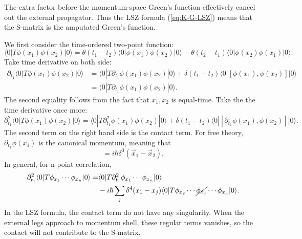 The extra factor before the momentum-space Green's function effectively cancel out the external propagator. 
Thus the LSZ formula (\ref{eq:K-G-LSZ}) means that the S-matrix is the amputated Green's function.


\begin{framedrmk}
We first consider the time-ordered two-point function:
\begin{equation*}
	\langle 0|T\phi(x_1)\phi(x_2)|0\rangle
	= \theta(t_1-t_2)\langle 0|\phi(x_1)\phi(x_2)|0\rangle -
	\theta(t_2-t_1)\langle 0|\phi(x_2)\phi(x_1)|0\rangle.
\end{equation*}	
Take time derivative on both side:
\begin{equation*}
\begin{aligned}
	\partial_{t_1} \langle 0|T\phi(x_1)\phi(x_2)|0\rangle
	&= \langle 0|T\partial_{t_1}\phi(x_1)\phi(x_2)|0\rangle +
	\delta(t_1-t_2)\langle 0|[\phi(x_1),\phi(x_2)]|0\rangle \\
	&= \langle 0|T\partial_{t_1}\phi(x_1)\phi(x_2)|0\rangle.
\end{aligned}
\end{equation*}
The second equality follows from the fact that $x_1,x_2$ is equal-time.
Take the the time derivative once more:
\begin{equation*}
	\partial^2_{t_1} \langle 0|T\phi(x_1)\phi(x_2)|0\rangle
	= \langle 0|T\partial^2_{t_1}\phi(x_1)\phi(x_2)|0\rangle +
	\delta(t_1-t_2)\langle 0|[\partial_{t_1}\phi(x_1),\phi(x_2)]|0\rangle.
\end{equation*}
The second term on the right hand side is the contact term.
For free theory, $\partial_{t_1}\phi(x_1)$ is the canonical momentum, meaning that
\begin{equation*}
	[\phi(\vec x_1, t),\partial_{t}\phi(\vec x_1,t)] = i \hbar \delta^{3}(\vec x_1-\vec x_2).
\end{equation*}
In general, for n-point correlation,
\begin{equation*}
\begin{aligned}
	 \partial_{t_1}^2 \langle 0|T\phi_{x_1}\cdots\phi_{x_n}|0\rangle 
	=& \langle 0|T\partial_{t_1}^2\phi_{x_1}\cdots\phi_{x_n}|0\rangle \\
	 &-i\hbar \sum_j \delta^4(x_1-x_j)\langle 0|T\phi_{x_2}\cdots\cancel{\phi_{x_j}}\cdots\phi_{x_n}|0\rangle.
\end{aligned}
\end{equation*}
In the LSZ formula, the contact term do not have any singularity.
When the external legs approach to momentum shell, these regular terms vanishes, so the contact will not contribute to the S-matrix.
\end{framedrmk}



